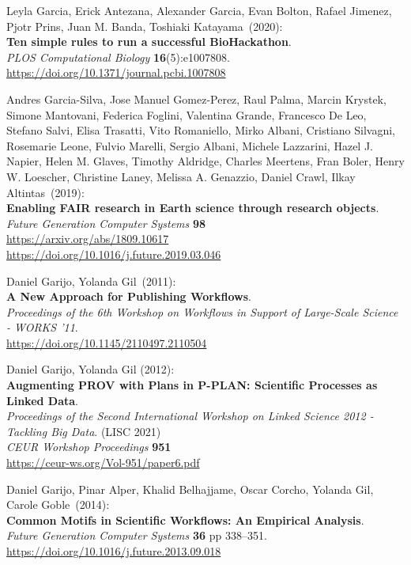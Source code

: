 \begin{thebibliography}{9}
Leyla Garcia, Erick Antezana, Alexander Garcia, Evan Bolton,
Rafael Jimenez, Pjotr Prins, Juan M. Banda, Toshiaki Katayama~(2020):\\
\textbf{Ten simple rules to run a successful BioHackathon}. \\
\emph{PLOS Computational Biology} \textbf{16}(5):e1007808.\\
\url{https://doi.org/10.1371/journal.pcbi.1007808}

Andres Garcia-Silva, Jose Manuel Gomez-Perez, Raul Palma,
Marcin Krystek, Simone Mantovani, Federica Foglini, Valentina Grande,
Francesco De Leo, Stefano Salvi, Elisa Trasatti, Vito Romaniello, Mirko
Albani, Cristiano Silvagni, Rosemarie Leone, Fulvio Marelli, Sergio
Albani, Michele Lazzarini, Hazel J. Napier, Helen M. Glaves, Timothy
Aldridge, Charles Meertens, Fran Boler, Henry W. Loescher, Christine
Laney, Melissa A. Genazzio, Daniel Crawl, Ilkay Altintas~(2019):\\
\textbf{Enabling FAIR research in Earth science through research
objects}.\\
\emph{Future Generation Computer Systems} \textbf{98} \\
\url{https://arxiv.org/abs/1809.10617}\\
\url{https://doi.org/10.1016/j.future.2019.03.046}

Daniel Garijo, Yolanda Gil~(2011):\\
\textbf{A New Approach for Publishing Workflows}.\\
\emph{Proceedings of
the 6th Workshop on Workflows in Support of Large-Scale Science - WORKS
'11}.\\
\url{https://doi.org/10.1145/2110497.2110504}

 Daniel Garijo, Yolanda Gil (2012):\\
\textbf{Augmenting PROV with Plans in P-PLAN: Scientific Processes as Linked Data}.\\
\emph{Proceedings of the Second International Workshop on Linked Science 2012 - Tackling Big Data}. (LISC 2021)\\
\emph{CEUR Workshop Proceedings} \textbf{951}\\
\url{https://ceur-ws.org/Vol-951/paper6.pdf}

Daniel Garijo, Pinar Alper, Khalid Belhajjame, Oscar Corcho,
Yolanda Gil, Carole Goble~(2014):\\
\textbf{Common Motifs in Scientific Workflows: An Empirical Analysis}.\\
\emph{Future Generation Computer Systems} \textbf{36} pp 338--351.\\
\url{https://doi.org/10.1016/j.future.2013.09.018}


\end{thebibliography}
